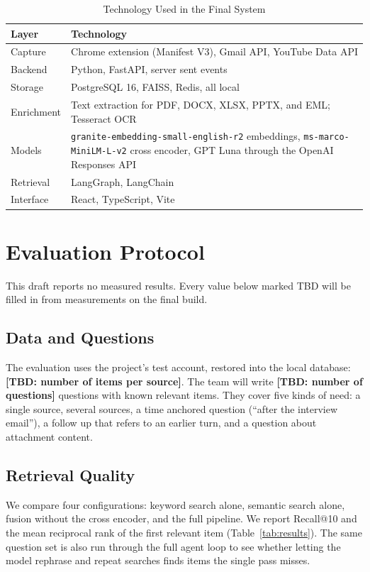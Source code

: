 \documentclass[conference]{IEEEtran}
\newcommand{\embmodel}{\texttt{granite\allowbreak-embedding\allowbreak-small\allowbreak-english\allowbreak-r2}}
\newcommand{\rerankmodel}{\texttt{ms\allowbreak-marco\allowbreak-MiniLM\allowbreak-L\allowbreak-6\allowbreak-v2}}
\newcommand{\llmname}{GPT\nobreakdash-5.6 Luna}
\newcommand{\tbd}[1]{\textbf{[TBD: #1]}}
\begin{document}
\begin{table}[t]
\caption{Technology Used in the Final System}
\label{tab:stack}
\centering
\renewcommand{\arraystretch}{1.15}
\begin{tabular}{|>{\raggedright\arraybackslash}p{2.0cm}|>{\raggedright\arraybackslash}p{5.55cm}|}
\hline
\textbf{Layer} & \textbf{Technology} \\
\hline
Capture & Chrome extension (Manifest V3), Gmail API, YouTube Data API \\
\hline
Backend & Python, FastAPI, server sent events \\
\hline
Storage & PostgreSQL 16, FAISS, Redis, all local \\
\hline
Enrichment & Text extraction for PDF, DOCX, XLSX, PPTX, and EML; Tesseract OCR \\
\hline
Models & \embmodel{} embeddings, \rerankmodel{} cross encoder, \llmname{} through the OpenAI Responses API \\
\hline
Retrieval & LangGraph, LangChain \\
\hline
Interface & React, TypeScript, Vite \\
\hline
\end{tabular}
\end{table}

\section{Evaluation Protocol}\label{sec:eval}
This draft reports no measured results. Every value below marked TBD will be filled in from measurements on the final build.

\subsection{Data and Questions}
The evaluation uses the project's test account, restored into the local database: \tbd{number of items per source}. The team will write \tbd{number of questions} questions with known relevant items. They cover five kinds of need: a single source, several sources, a time anchored question (``after the interview email''), a follow up that refers to an earlier turn, and a question about attachment content.

\subsection{Retrieval Quality}
We compare four configurations: keyword search alone, semantic search alone, fusion without the cross encoder, and the full pipeline. We report Recall@10 and the mean reciprocal rank of the first relevant item (Table~\ref{tab:results}). The same question set is also run through the full agent loop to see whether letting the model rephrase and repeat searches finds items the single pass misses.
\end{document}
